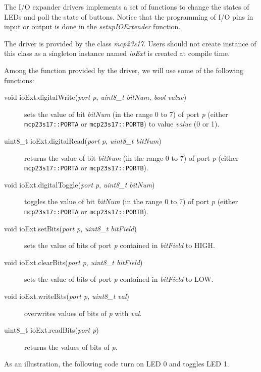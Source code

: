 \documentclass[11pt]{report}
\begin{document}
The I/O expander drivers implements a set of functions to change the states of LEDs and poll the state of buttons.
Notice that the programming of I/O pins in input or output is done in the \textit{setupIOExtender} function.

The driver is provided by the class \textit{mcp23s17}.
Users should not create instance of this class as a singleton instance named \textit{ioExt} is created at compile time.

Among the function provided by the driver, we will use some of the following functions:

\begin{description}
    \item[void ioExt.digitalWrite(\textit{port p}, \textit{uint8\_t bitNum, bool value})] sets the value of bit \textit{bitNum} (in the range 0 to 7) of port \textit{p} (either \texttt{mcp23s17::PORTA} or \texttt{mcp23s17::PORTB}) to value \textit{value} (0 or 1).

    \item[uint8\_t ioExt.digitalRead(\textit{port p}, \textit{uint8\_t bitNum})] returns the value of bit \textit{bitNum} (in the range 0 to 7) of port \textit{p} (either \texttt{mcp23s17::PORTA} or \texttt{mcp23s17::PORTB}).

    \item[void ioExt.digitalToggle(\textit{port p}, \textit{uint8\_t bitNum})] toggles the value of bit \textit{bitNum} (in the range 0 to 7) of port \textit{p} (either \texttt{mcp23s17::PORTA} or \texttt{mcp23s17::PORTB}).

    \item[void ioExt.setBits(\textit{port p}, \textit{uint8\_t bitField})] sets the value of bits of port \textit{p} contained in \textit{bitField} to HIGH.

    \item[void ioExt.clearBits(\textit{port p}, \textit{uint8\_t bitField})] sets the value of bits of port \textit{p} contained in \textit{bitField} to LOW.

    \item[void ioExt.writeBits(\textit{port p}, \textit{uint8\_t val})] overwrites values of bits of \textit{p} with \textit{val}.

    \item[uint8_t ioExt.readBits(\textit{port p})] returns the values of bits of \textit{p}.
\end{description}

As an illustration, the following code turn on LED 0 and toggles LED 1.
\end{document}
